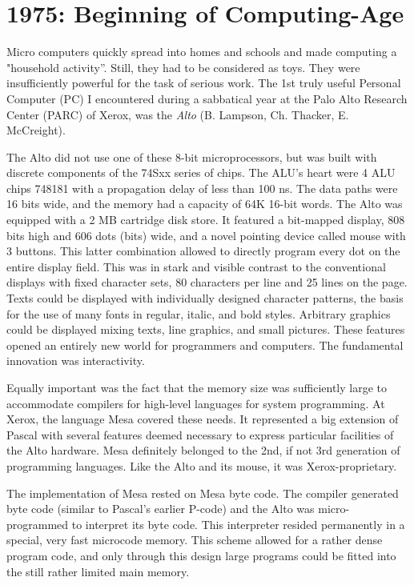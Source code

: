 \section{1975: Beginning of Computing-Age}
Micro computers quickly spread into homes and schools and made computing a "household
activity”. Still, they had to be considered as toys. They were insufficiently powerful
for the task of serious work. The 1st truly useful Personal Computer (PC) I
encountered during a sabbatical year at the Palo Alto Research Center (PARC) of Xerox,
was the \emph{Alto} (B. Lampson, Ch. Thacker, E. McCreight).

The Alto did not use one of these 8-bit microprocessors, but was built with discrete
components of the 74Sxx series of chips. The ALU's heart were 4 ALU chips 748181 with
a propagation delay of less than 100 ns. The data paths were 16 bits wide, and the
memory had a capacity of 64K 16-bit words. The Alto was equipped with a 2 MB cartridge
disk store. It featured a bit-mapped display, 808 bits high and 606 dots (bits) wide,
and a novel pointing device called mouse with 3 buttons. This latter combination
allowed to directly program every dot on the entire display field. This was in stark
and visible contrast to the conventional displays with fixed character sets, 80
characters per line and 25 lines on the page. Texts could be displayed with
individually designed character patterns, the basis for the use of many fonts in
regular, italic, and bold styles. Arbitrary graphics could be displayed mixing texts,
line graphics, and small pictures. These features opened an entirely new world for
programmers and computers. The fundamental innovation was interactivity.

Equally important was the fact that the memory size was sufficiently large to
accommodate compilers for high-level languages for system programming. At Xerox, the
language Mesa covered these needs. It represented a big extension of Pascal with
several features deemed necessary to express particular facilities of the Alto
hardware. Mesa definitely belonged to the 2nd, if not 3rd generation of programming
languages. Like the Alto and its mouse, it was Xerox-proprietary.

The implementation of Mesa rested on Mesa byte code. The compiler generated byte code
(similar to Pascal's earlier P-code) and the Alto was micro-programmed to interpret
its byte code. This interpreter resided permanently in a special, very fast microcode
memory. This scheme allowed for a rather dense program code, and only through this
design large programs could be fitted into the still rather limited main memory.

